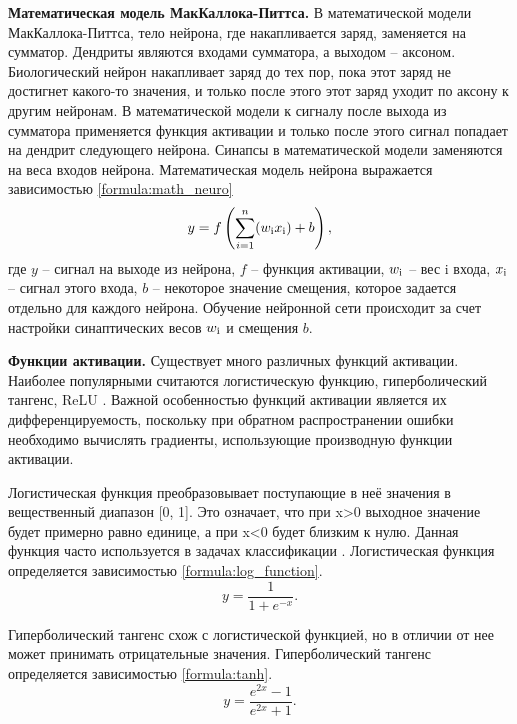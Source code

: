 \textbf{Математическая модель МакКаллока-Питтса.}
В математической модели МакКаллока-Питтса, тело нейрона, где накапливается заряд, заменяется на сумматор. 
Дендриты являются входами сумматора, а выходом -- аксоном. 
Биологический нейрон накапливает заряд до тех пор, пока этот заряд не достигнет какого-то значения, и только после этого этот заряд уходит по аксону к другим нейронам. 
В математической модели к сигналу после выхода из сумматора применяется функция активации и только после этого сигнал попадает на дендрит следующего нейрона. 
Синапсы в математической модели заменяются на веса входов нейрона. 
Математическая модель нейрона выражается зависимостью \ref{formula:math_neuro}
\begin{equation}\label{formula:math_neuro}
y = f\left(\sum\limits_{i = 1}^{n}(w_{\rm{i}}x_{\rm{i}}) + b\right),
\end{equation}
где $y$ -- сигнал на выходе из нейрона, $f$ -- функция активации, $w_{\rm{i}}$ -- вес i входа, $x_{\rm{i}}$ -- сигнал этого входа, $b$ -- некоторое значение смещения, которое задается отдельно для каждого нейрона.
Обучение нейронной сети происходит за счет настройки синаптических весов $w_{\rm{i}}$ и смещения $b$.

\textbf{Функции активации.}
Существует много различных функций активации.
Наиболее популярными считаются логистическую функцию, гиперболический тангенс, ReLU \cite{activation_function}. Важной особенностью функций активации является их дифференцируемость, поскольку при обратном распространении ошибки необходимо вычислять градиенты, использующие производную функции активации.

Логистическая функция преобразовывает поступающие в неё значения в вещественный диапазон [0, 1]. 
Это означает, что при x>0 выходное значение будет примерно равно единице, а при x<0 будет близким к нулю. 
Данная функция часто используется в задачах классификации \cite{activation_function}. 
Логистическая функция определяется зависимостью \ref{formula:log_function}.
\begin{equation}\label{formula:log_function}
y = \frac{1}{1 + e^{-x}}.
\end{equation}

Гиперболический тангенс схож с логистической функцией, но в отличии от нее может принимать отрицательные значения. 
Гиперболический тангенс определяется зависимостью \ref{formula:tanh}.
\begin{equation}\label{formula:tanh}
y = \frac{e^{2x} - 1}{e^{2x} + 1}.
\end{equation}

